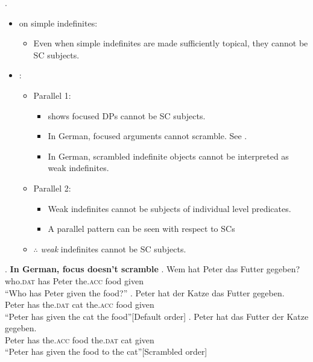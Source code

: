 \documentclass[GPFinal]{subfiles}
\begin{document}
\z.
\begin{itemize}
  \item \textcite{mikkelsen2004specifying} on simple indefinites:
    \begin{itemize}
      \item Even when simple indefinites are made sufficiently topical, they cannot be SC subjects.
    \end{itemize}
  \item \textcite{heycock2012specification}:
    \begin{itemize}
      \item Parallel 1:
	\begin{itemize}
	  \item \Last shows focused DPs cannot be SC subjects.
	  \item In German, focused arguments cannot scramble. See \Next[b]. \parencite{lenerz1977zur}
	  \item In German, scrambled indefinite objects cannot be interpreted as weak indefinites. \parencite{dehoop1992case,diesing1992indefinites}
	\end{itemize}
      \item Parallel 2:
	\begin{itemize}
	  \item Weak indefinites cannot be subjects of individual level predicates. \parencite{milsark1974existential}
	  \item A parallel pattern can be seen with respect to SCs
	\end{itemize}
      \item $\therefore$ \textit{weak} indefinites cannot be SC subjects.
    \end{itemize}
\end{itemize}
\ex. \textbf{In German, focus doesn't scramble}
  \ag. Wem hat Peter das Futter gegeben?\\
who.\textsc{dat} has Peter the.\textsc{acc} food given\\
``Who has Peter given the food?''
    \ag. Peter hat der Katze das Futter gegeben.\\
Peter has the.\textsc{dat} cat the.\textsc{acc} food given\\
``Peter has given the cat the food''\hfill[Default order]
    \bg. Peter hat das Futter der Katze gegeben.\\
Peter has the.\textsc{acc} food the.\textsc{dat} cat given\\
``Peter has given the food to the cat''\hfill[Scrambled order]
\end{document}
